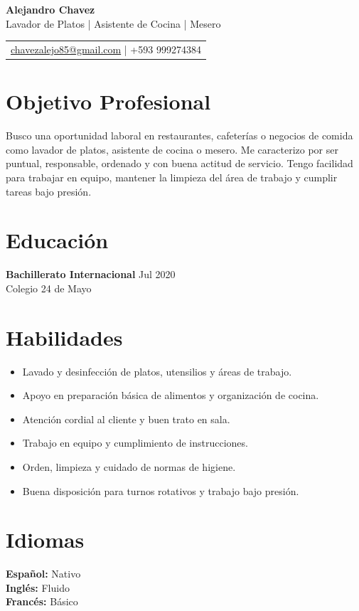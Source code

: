 \documentclass[11pt,a4paper]{article}
\newenvironment{uniformindent}{%
  \begin{list}{}{%
    \setlength{\leftmargin}{2em}
    \setlength{\rightmargin}{0pt}
    \setlength{\topsep}{0pt}
    \setlength{\partopsep}{0pt}
    \setlength{\parsep}{0pt}
    \setlength{\itemsep}{0pt}
  }
  \item[]
}{%
  \end{list}
}
\begin{document}
\begin{center}
    {\LARGE \textbf{Alejandro Chavez}} \\[0.15cm]
    Lavador de Platos | Asistente de Cocina | Mesero \\[0.2cm]
    \begin{tabular}{@{} c @{}}
        \href{mailto:chavezalejo85@gmail.com}{chavezalejo85@gmail.com} \quad | \quad +593 999274384
    \end{tabular}
\end{center}

\begin{uniformindent}

\section*{Objetivo Profesional}
Busco una oportunidad laboral en restaurantes, cafeter\'ias o negocios de comida como lavador de platos, asistente de cocina o mesero. Me caracterizo por ser puntual, responsable, ordenado y con buena actitud de servicio. Tengo facilidad para trabajar en equipo, mantener la limpieza del \'area de trabajo y cumplir tareas bajo presi\'on.

\section*{Educaci\'on}

\begin{samepage}
\textbf{Bachillerato Internacional} \hfill Jul 2020\\
Colegio 24 de Mayo\\
\end{samepage}

\section*{Habilidades}

\begin{itemize}
    \item Lavado y desinfecci\'on de platos, utensilios y \'areas de trabajo.
    \item Apoyo en preparaci\'on b\'asica de alimentos y organizaci\'on de cocina.
    \item Atenci\'on cordial al cliente y buen trato en sala.
    \item Trabajo en equipo y cumplimiento de instrucciones.
    \item Orden, limpieza y cuidado de normas de higiene.
    \item Buena disposici\'on para turnos rotativos y trabajo bajo presi\'on.
\end{itemize}

\section*{Idiomas}

\textbf{Espa\~nol:} Nativo\\
\textbf{Ingl\'es:} Fluido\\
\textbf{Franc\'es:} B\'asico

\end{uniformindent}
\end{document}
